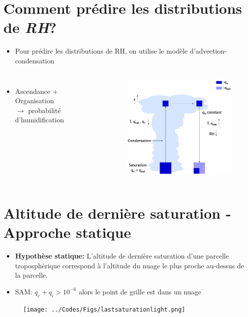 \documentclass[10pt]{beamer}
\begin{document}
\section*{Comment prédire les distributions de \textit{RH}?}
\begin{frame}{\secname}
     \begin{itemize}
         \item Pour prédire les distributions de RH, on utilise le modèle d'advection-condensation \autocite{pierrehumbertRelativeHumidityAtmosphere2007,Vallis2017}
     \end{itemize}
     \vspace{-1cm}
     \begin{columns}
         \begin{itemize}
            \item Ascendance + Organisation \\ $\rightarrow$ probabilité d'humidification
        \end{itemize}
         \begin{figure}[hbtp]
            \centering
            \includegraphics[width=6.6cm]{Figures/advec-condens.png}
        \end{figure}
     \end{columns}
\end{frame}

\section*{Altitude de dernière saturation - Approche statique}
\begin{frame}{\secname}
    \begin{itemize}
        \setlength{\itemsep}{4pt}
        \item \textbf{Hypothèse statique:} L'altitude de dernière saturation d'une parcelle troposphérique correspond à l'altitude du nuage le plus proche au-dessus de la parcelle.
        \item SAM: $q_c + q_i > 10^{-6}$ alors le point de grille est dans un nuage \autocite{Risi2021}
    \end{itemize}
    \begin{figure}[hbtp]
        \centering
        \texttt{[image: ../Codes/Figs/lastsaturationlight.png]}
    \end{figure}
\end{frame}
\end{document}
